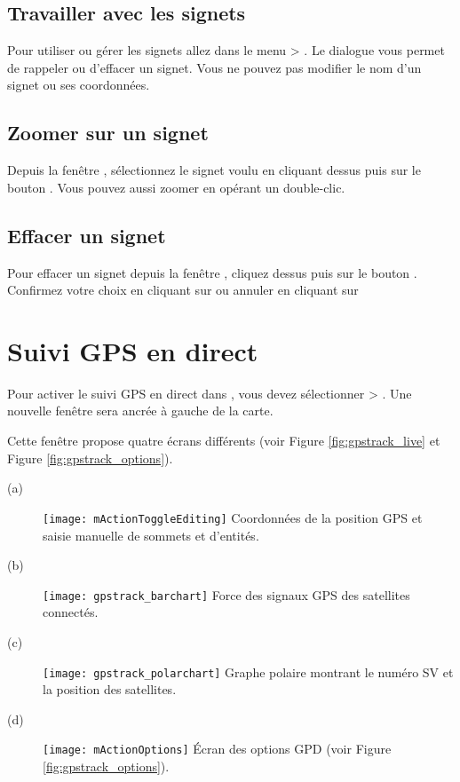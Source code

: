 \subsection{Travailler avec les signets}
Pour utiliser ou gérer les signets allez dans le menu  > .
Le dialogue  vous permet de rappeler ou d'effacer un signet.
Vous ne pouvez pas modifier le nom d'un signet ou ses coordonnées.

\subsection{Zoomer sur un signet}
Depuis la fenêtre , sélectionnez le signet voulu en cliquant dessus puis sur le bouton . Vous pouvez aussi zoomer en opérant un double-clic.

\subsection{Effacer un signet}
Pour effacer un signet depuis la fenêtre , cliquez dessus puis sur le bouton .
Confirmez votre choix en cliquant sur  ou annuler en cliquant sur 

\section{Suivi GPS en direct} \label{sec:gpstracking}

Pour activer le suivi GPS en direct dans \qg, vous devez sélectionner  > . Une nouvelle fenêtre sera ancrée à gauche de la carte.

Cette fenêtre propose quatre écrans différents (voir Figure \ref{fig:gpstrack_live} et Figure \ref{fig:gpstrack_options}).

\begin{description}
 \item[(a)] \texttt{[image: mActionToggleEditing]} 
Coordonnées de la position GPS et saisie manuelle de sommets et d'entités.
 \item[(b)] \texttt{[image: gpstrack\_barchart]} 
Force des signaux GPS des satellites connectés. 
 \item[(c)] \texttt{[image: gpstrack\_polarchart]} 
Graphe polaire montrant le numéro SV et la position des satellites. 
 \item[(d)] \texttt{[image: mActionOptions]} 
Écran des options GPD (voir Figure \ref{fig:gpstrack_options}).
\end{description}

